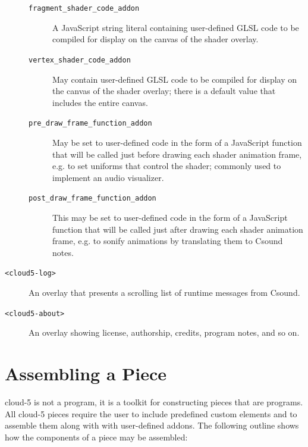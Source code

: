 \documentclass[runningheads,a4paper]{llncs}
\begin{document}
\begin{description}
\begin{description}
\item[\texttt{fragment\_shader\_code\_addon}] A JavaScript string literal containing user-defined GLSL code to be compiled for display on the canvas of the shader overlay.
\item[\texttt{vertex\_shader\_code\_addon}] May contain user-defined GLSL code to be compiled for display on the canvas of the shader overlay; there is a default value that includes the entire canvas.
\item[\texttt{pre\_draw\_frame\_function\_addon}] May be set to user-defined code in the form of a JavaScript function that will be called just before drawing each shader animation frame, e.g. to set uniforms that control the shader; commonly used to implement an audio visualizer.
\item[\texttt{post\_draw\_frame\_function\_addon}] This may be set to user-defined code in the form of a JavaScript function that will be called just after drawing each shader animation frame, e.g. to sonify animations by translating them to Csound notes.
\end{description}
\item[\texttt{<cloud5-log>}] An overlay that presents a scrolling list of runtime messages from Csound.
\item[\texttt{<cloud5-about>}] An overlay showing license, authorship, credits, program notes, and so on.
\end{description}

\section{Assembling a Piece}

cloud-5 is not a program, it is a toolkit for constructing pieces that are programs. All cloud-5 pieces require the user to include predefined custom elements and to assemble them along with with user-defined addons. The following outline shows how the components of a piece may be assembled:
\end{document}
